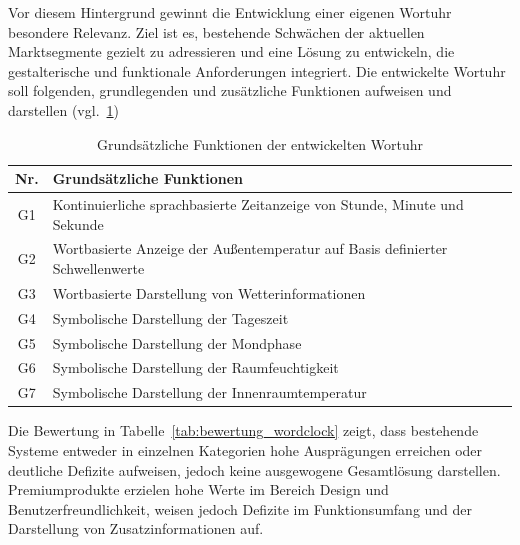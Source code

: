 Vor diesem Hintergrund gewinnt die Entwicklung einer eigenen Wortuhr besondere Relevanz. 
Ziel ist es, bestehende Schwächen der aktuellen Marktsegmente gezielt zu adressieren und eine Lösung zu entwickeln, die gestalterische und funktionale Anforderungen integriert. 
Die entwickelte Wortuhr soll folgenden, grundlegenden und zusätzliche Funktionen aufweisen und darstellen (vgl.~\ref{tab:SollFunktionen})

\begin{table}[H]
\centering
\begin{tabular}{cl}
\textbf{Nr.} & \textbf{Grundsätzliche Funktionen} \\ \hline
G1 & Kontinuierliche sprachbasierte Zeitanzeige von Stunde, Minute und Sekunde \\
G2 & Wortbasierte Anzeige der Außentemperatur auf Basis definierter Schwellenwerte \\
G3 & Wortbasierte Darstellung von Wetterinformationen \\
G4 & Symbolische Darstellung der Tageszeit \\
G5 & Symbolische Darstellung der Mondphase \\
G6 & Symbolische Darstellung der Raumfeuchtigkeit \\
G7 & Symbolische Darstellung der Innenraumtemperatur \\
\end{tabular}
\caption{Grundsätzliche Funktionen der entwickelten Wortuhr}
\label{tab:SollFunktionen}
\end{table}

Die Bewertung in Tabelle~\ref{tab:bewertung_wordclock} zeigt, dass bestehende Systeme entweder in einzelnen Kategorien hohe Ausprägungen erreichen oder deutliche Defizite aufweisen, jedoch keine ausgewogene Gesamtlösung darstellen. 
Premiumprodukte erzielen hohe Werte im Bereich Design und Benutzerfreundlichkeit, weisen jedoch Defizite im Funktionsumfang und der Darstellung von Zusatzinformationen auf. 

